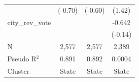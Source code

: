 \begin{tabular*}{\textwidth}{@{\extracolsep{\fill}}lccc}
                        & (-0.70)          & (-0.60)              & (1.42)\\   
   city\_rev\_vote      &                   &                       & -0.642\\   
                        &                   &                       & (-0.14)\\   
   \hline
   N         & 2,577             & 2,577                 & 2,389\\  
   Pseudo R$^2$         & 0.891             & 0.892                 & 0.0004\\  
   Cluster              & State & State & State\\  
   \bottomrule
\end{tabular*}
\par\endgroup
